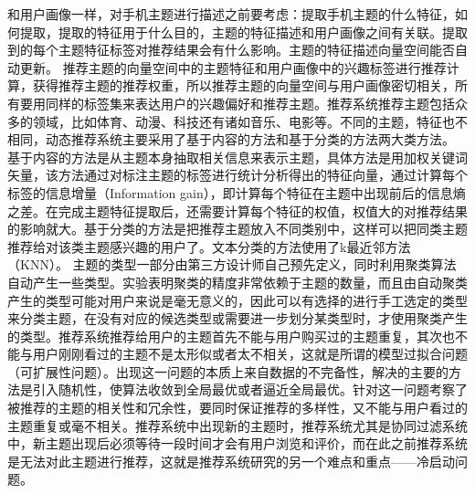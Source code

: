   和用户画像一样，对手机主题进行描述之前要考虑：提取手机主题的什么特征，如何提取，提取的特征用于什么目的，主题的特征描述和用户画像之间有关联。提取到的每个主题特征标签对推荐结果会有什么影响。主题的特征描述向量空间能否自动更新。
  推荐主题的向量空间中的主题特征和用户画像中的兴趣标签进行推荐计算，获得推荐主题的推荐权重，所以推荐主题的向量空间与用户画像密切相关，所有要用同样的标签集来表达用户的兴趣偏好和推荐主题。推荐系统推荐主题包括众多的领域，比如体育、动漫、科技还有诸如音乐、电影等。不同的主题，特征也不相同，动态推荐系统主要采用了基于内容的方法和基于分类的方法两大类方法。 基于内容的方法是从主题本身抽取相关信息来表示主题，具体方法是用加权关键词矢量，该方法通过对标注主题的标签进行统计分析得出的特征向量，通过计算每个标签的信息增量（Information gain），即计算每个特征在主题中出现前后的信息熵之差。在完成主题特征提取后，还需要计算每个特征的权值，权值大的对推荐结果的影响就大。基于分类的方法是把推荐主题放入不同类别中，这样可以把同类主题推荐给对该类主题感兴趣的用户了。文本分类的方法使用了k最近邻方法（KNN）。 主题的类型一部分由第三方设计师自己预先定义，同时利用聚类算法自动产生一些类型。实验表明聚类的精度非常依赖于主题的数量，而且由自动聚类产生的类型可能对用户来说是毫无意义的，因此可以有选择的进行手工选定的类型来分类主题，在没有对应的候选类型或需要进一步划分某类型时，才使用聚类产生的类型。推荐系统推荐给用户的主题首先不能与用户购买过的主题重复，其次也不能与用户刚刚看过的主题不是太形似或者太不相关，这就是所谓的模型过拟合问题（可扩展性问题）。出现这一问题的本质上来自数据的不完备性，解决的主要的方法是引入随机性，使算法收敛到全局最优或者逼近全局最优。针对这一问题考察了被推荐的主题的相关性和冗余性，要同时保证推荐的多样性，又不能与用户看过的主题重复或毫不相关。推荐系统中出现新的主题时，推荐系统尤其是协同过滤系统中，新主题出现后必须等待一段时间才会有用户浏览和评价，而在此之前推荐系统是无法对此主题进行推荐，这就是推荐系统研究的另一个难点和重点——冷启动问题。
  
